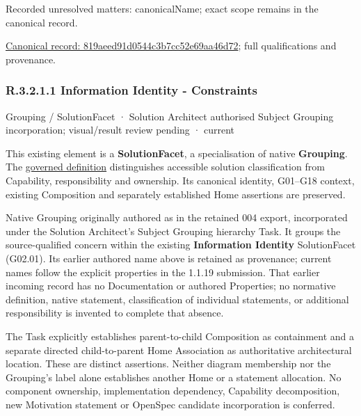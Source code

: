 {\small Recorded unresolved matters: canonicalName; exact scope remains in the canonical record.}\par
{\footnotesize \href{../../../../../../../continuum/grouping/819aeed91d0544c3b7cc52e69aa46d72.md}{Canonical record: 819aeed91d0544c3b7cc52e69aa46d72}; full qualifications and provenance.}\par
\subsubsection*{R.3.2.1.1 Information Identity - Constraints}
\label{navigation:R.3.2.1.1}

\label{element:9c7c9de7ffc0457d87cf52548bca70ca}
{\small Grouping / SolutionFacet · Solution Architect authorised Subject Grouping incorporation; visual/result review pending · current}\par

This existing element is a \textbf{SolutionFacet}, a specialisation of native
\textbf{Grouping}. The \href{\detokenize{../../../../../../../governance/continuum-representation.md#solutionfacet-classification--1119-candidate}}{governed definition}
distinguishes accessible solution classification from Capability, responsibility
and ownership. Its canonical identity, G01–G18 context, existing Composition
and separately established Home assertions are preserved.



Native Grouping originally authored as \texttt{} in the retained 004 export,
incorporated under the Solution Architect's Subject Grouping hierarchy Task.
It groups the source-qualified \texttt{} concern within
the existing \textbf{Information Identity} SolutionFacet (G02.01). Its earlier authored name above is retained as provenance; current names
follow the explicit properties in the 1.1.19 submission.
That earlier incoming record has no Documentation or authored Properties; no normative
definition, native statement, classification of individual statements, or
additional responsibility is invented to complete that absence.



The Task explicitly establishes parent-to-child Composition as containment and
a separate directed child-to-parent Home Association as authoritative architectural
location. These are distinct assertions. Neither diagram membership nor the
Grouping's label alone establishes another Home or a statement allocation.
No component ownership, implementation dependency, Capability decomposition,
new Motivation statement or OpenSpec candidate incorporation is conferred.



